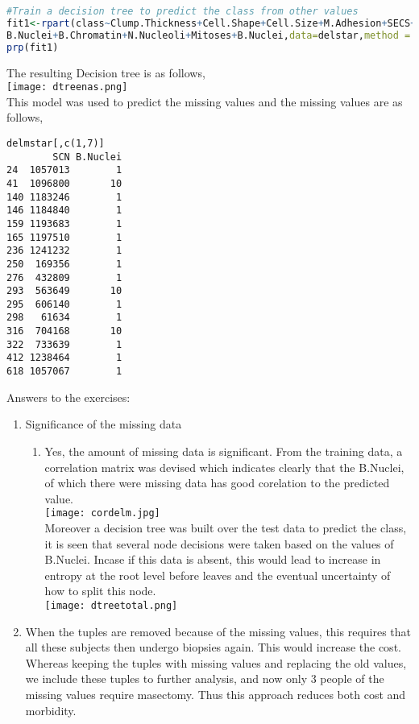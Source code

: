 \documentclass{article}
\begin{document}
\begin{enumerate}
\begin{enumerate}
\begin{enumerate}
\begin{lstlisting}[language=R]
#Train a decision tree to predict the class from other values
fit1<-rpart(class~Clump.Thickness+Cell.Shape+Cell.Size+M.Adhesion+SECS+
B.Nuclei+B.Chromatin+N.Nucleoli+Mitoses+B.Nuclei,data=delstar,method = "class")
prp(fit1)
\end{lstlisting}
The resulting Decision tree is as follows,\\
\texttt{[image: dtreenas.png]}
\\This model was used to predict the missing values and the missing values are as follows,
\begin{verbatim}
delmstar[,c(1,7)]
        SCN B.Nuclei
24  1057013        1
41  1096800       10
140 1183246        1
146 1184840        1
159 1193683        1
165 1197510        1
236 1241232        1
250  169356        1
276  432809        1
293  563649       10
295  606140        1
298   61634        1
316  704168       10
322  733639        1
412 1238464        1
618 1057067        1
\end{verbatim}
\end{enumerate}
\end{enumerate}
Answers to the exercises:
\begin{enumerate}
\item Significance of the missing data
\begin{enumerate}
\item Yes, the amount of missing data is significant. From the training data, a correlation matrix was devised which indicates clearly that the B.Nuclei, of which there were missing data has good corelation to the predicted value.\\
\texttt{[image: cordelm.jpg]}\\
Moreover a decision tree was built over the test data to predict the class, it is seen that several node decisions were taken based on the values of B.Nuclei. Incase if this data is absent, this would lead to increase in entropy at the root level before leaves and the eventual uncertainty of how to split this node.\\
\texttt{[image: dtreetotal.png]}
\end{enumerate}
\item When the tuples are removed because of the missing values, this requires that all these subjects then undergo biopsies again. This would increase the cost. Whereas keeping the tuples with missing values and replacing the old values, we include these tuples to further analysis, and now only 3 people of the missing values require masectomy. Thus this approach reduces both cost and morbidity. 

\end{enumerate}
\end{enumerate}
\end{document}
